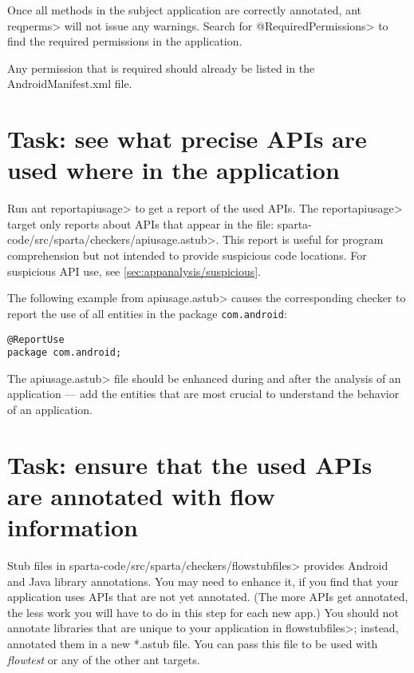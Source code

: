 Once all methods in the subject application are correctly annotated,
\<ant reqperms> will not issue any warnings.
Search for \<@RequiredPermissions> to find the required permissions
in the application.

Any permission that is required should already be listed in the AndroidManifest.xml file. 





\section{Task: see what precise APIs are used where in the application}

Run \<ant reportapiusage> to get a report of the used APIs. The
\<reportapiusage> target only reports about APIs that appear in the file:
\<sparta-code/src/sparta/checkers/apiusage.astub>. This report is useful
for program comprehension but not intended to provide suspicious code
locations. For suspicious API use, see
\ref{sec:appanalysis/suspicious}.

The following example from \<apiusage.astub> causes the corresponding 
checker to report the use of all entities in the package 
\verb|com.android|:

\begin{Verbatim}
@ReportUse                                                         
package com.android;
\end{Verbatim}

The \<apiusage.astub> file should be enhanced during and after the 
analysis of an application --- add the entities that are most crucial to
understand the behavior of an application.



\section{Task: ensure that the used APIs are annotated with flow information\label{flow-task-annotate-apis}}

Stub files in  \<sparta-code/src/sparta/checkers/flowstubfiles> provides Android and Java
library annotations.  You may need to enhance it, if you find that your application
uses APIs that are not yet annotated.
(The  more APIs get annotated, the less work you will have to do in this
step for each new app.) You should not annotate libraries that are unique to your application in \<flowstubfiles>;
instead, annotated them in a new *.astub file. You can pass this file to be used with 
\emph{flowtest} or any of the other ant targets.

